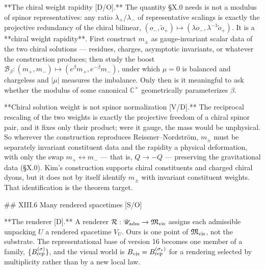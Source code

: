 **The chiral weight rapidity [D/O].** The quantity §X.0 needs is not a modulus of spinor representatives: any ratio $\lambda_+/\lambda_-$ of representative scalings is exactly the projective redundancy of the chiral bilinear, $(o_-,\tilde o_+)\mapsto(\lambda o_-,\lambda^{-1}\tilde o_+)$. It is a **chiral weight rapidity**. First construct $m_\pm$ as gauge-invariant scalar data of the two chiral solutions — residues, charges, asymptotic invariants, or whatever the construction produces; then study the boost $\mathcal B_\beta:(m_+,m_-)\mapsto(e^\beta m_+,e^{-\beta}m_-)$, under which $\mu = 0$ is balanced and chargeless and $|\mu|$ measures the imbalance. Only then is it meaningful to ask whether the modulus of some canonical $\mathbb{C}^\times$ geometrically parameterizes $\beta$.

**Chiral solution weight is not spinor normalization [V/D].** The reciprocal rescaling of the two weights is exactly the projective freedom of a chiral spinor pair, and it fixes only their product; were it gauge, the mass would be unphysical. So wherever the construction reproduces Reissner–Nordström, $m_\pm$ must be separately invariant constituent data and the rapidity a physical deformation, with only the swap $m_+\leftrightarrow m_-$ — that is, $Q\to-Q$ — preserving the gravitational data (§X.0). Kim's construction supports chiral constituents and charged chiral dyons, but it does not by itself identify $m_\pm$ with invariant constituent weights. That identification is the theorem target.

## XIII.6 Many rendered spacetimes [S/O]

**The renderer [D].** A renderer $\mathcal R:\mathscr U_{\rm adm}\to\mathfrak M_{\rm vis}$ assigns each admissible unpacking $U$ a rendered spacetime $V_U$. Ours is one point of $\mathfrak M_{\rm vis}$, not the substrate. The representational base of version 16 becomes one member of a family, $\{B_{\rm rep}^{(\sigma)}\}$, and the visual world is $B_{\rm vis} = B_{\rm rep}^{(\sigma_*)}$ for a rendering selected by multiplicity rather than by a new local law.

